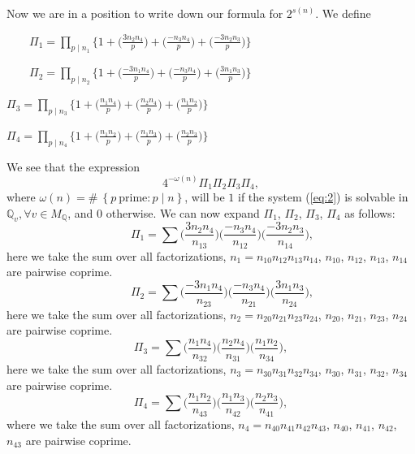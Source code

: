 \documentclass[11pt]{article}
\newcommand{\Q}{ {\mathbb{Q}} }
\newcommand{\Qv}{ {\mathbb{Q}_v} }
\begin{document}
\noindent Now we are in a position to write down our formula for $2^{s(n)}$.
We define
\begin{center}
$\qquad \Pi_{1}=\prod\limits_{p\mid n_{1}}\biggl\{1+\biggl(\frac{3n_{2}n_{4}}{p}\biggr)+\biggl(\frac{-n_{3}n_{4}}{p}\biggr)+\biggl(\frac{-3n_{2}n_{3}}{p}\biggr)\biggr\}$    
\end{center}
\begin{center}
$\qquad \Pi_{2}=\prod\limits_{p\mid n_{2}}\biggl\{1+\biggl(\frac{-3n_{1}n_{4}}{p}\biggr)+\biggl(\frac{-n_{3}n_{4}}{p}\biggr)+\biggl(\frac{3n_{1}n_{3}}{p}\biggr)\biggr\}$    
\end{center}
\begin{center}
$\Pi_{3}=\prod\limits_{p\mid n_{3}}\biggl\{1+\biggl(\frac{n_{1}n_{4}}{p}\biggr)+\biggl(\frac{n_{2}n_{4}}{p}\biggr)+\biggl(\frac{n_{1}n_{2}}{p}\biggr)\biggr\}$    
\end{center}
\begin{center}
$\Pi_{4}=\prod\limits_{p\mid n_{4}}\biggl\{1+\biggl(\frac{n_{1}n_{2}}{p}\biggr)+\biggl(\frac{n_{1}n_{3}}{p}\biggr)+\biggl(\frac{n_{2}n_{3}}{p}\biggr)\biggr\}$    
\end{center}
We see that the expression
$$4^{-\omega(n)}\Pi_{1}\Pi_{2}\Pi_{3}\Pi_{4},$$
where $\omega(n)=\#\:\left\{p\: \text{prime}: p\mid n \right\}$, will be $1$ if the system (\ref{eq:2}) is solvable in $\Qv, \forall v\in M_{\Q}$, and $0$ otherwise. We can now expand $\Pi_{1}$, $\Pi_{2}$, $\Pi_{3}$, $\Pi_{4}$ as follows:
$$\qquad \Pi_{1}=\sum \biggl(\frac{3n_{2}n_{4}}{n_{13}}\biggr)\biggl(\frac{-n_{3}n_{4}}{n_{12}}\biggr)\biggl(\frac{-3n_{2}n_{3}}{n_{14}}\biggr),$$
here we take the sum over all factorizations, 
$n_{1}=n_{10}n_{12}n_{13}n_{14}$, $n_{10}$, $n_{12}$, $n_{13}$, $n_{14}$ are pairwise coprime.
$$\qquad \Pi_{2}=\sum \biggl(\frac{-3n_{1}n_{4}}{n_{23}}\biggr)\biggl(\frac{-n_{3}n_{4}}{n_{21}}\biggr)\biggl(\frac{3n_{1}n_{3}}{n_{24}}\biggr),$$
here we take the sum over all factorizations, $n_{2}=n_{20}n_{21}n_{23}n_{24}$, $n_{20}$, $n_{21}$, $n_{23}$, $n_{24}$ are pairwise coprime.
$$\Pi_{3}=\sum \biggl(\frac{n_{1}n_{4}}{n_{32}}\biggr)\biggl(\frac{n_{2}n_{4}}{n_{31}}\biggr)\biggl(\frac{n_{1}n_{2}}{n_{34}}\biggr),$$
here we take the sum over all factorizations, $n_{3}=n_{30}n_{31}n_{32}n_{34}$, $n_{30}$, $n_{31}$, $n_{32}$, $n_{34}$ are pairwise coprime.
$$\Pi_{4}=\sum \biggl(\frac{n_{1}n_{2}}{n_{43}}\biggr)\biggl(\frac{n_{1}n_{3}}{n_{42}}\biggr)\biggl(\frac{n_{2}n_{3}}{n_{41}}\bigg),$$
where we take the sum over all factorizations, $n_{4}=n_{40}n_{41}n_{42}n_{43}$, $n_{40}$, $n_{41}$, $n_{42}$, $n_{43}$ are pairwise coprime.\\
\end{document}
